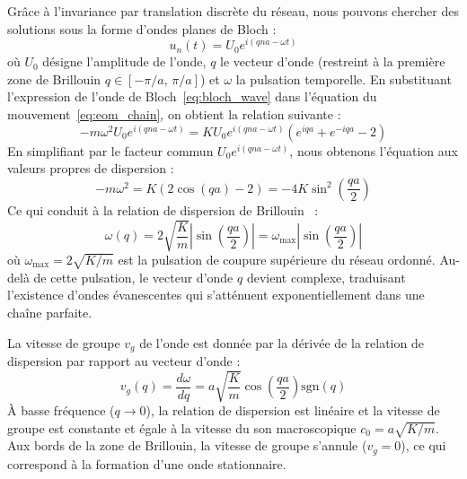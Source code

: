 \documentclass[11pt, a4paper, twoside]{article}
\begin{document}
Grâce à l'invariance par translation discrète du réseau, nous pouvons chercher des solutions sous la forme d'ondes planes de Bloch :
\begin{equation}\label{eq:bloch_wave}
    u_n(t) = U_0 e^{i(q n a - \omega t)}
\end{equation}
où $U_0$ désigne l'amplitude de l'onde, $q$ le vecteur d'onde (restreint à la première zone de Brillouin $q \in [-\pi/a, \, \pi/a]$) et $\omega$ la pulsation temporelle. En substituant l'expression de l'onde de Bloch~\eqref{eq:bloch_wave} dans l'équation du mouvement~\eqref{eq:eom_chain}, on obtient la relation suivante :
\begin{equation*}
    -m \omega^2 U_0 e^{i(q n a - \omega t)} = K U_0 e^{i(q n a - \omega t)} \left( e^{iqa} + e^{-iqa} - 2 \right)
\end{equation*}
En simplifiant par le facteur commun $U_0 e^{i(q n a - \omega t)}$, nous obtenons l'équation aux valeurs propres de dispersion :
\begin{equation*}
    -m \omega^2 = K \left( 2\cos(qa) - 2 \right) = -4K \sin^2\left(\frac{qa}{2}\right)
\end{equation*}
Ce qui conduit à la relation de dispersion de Brillouin~\cite{brillouin1953wave} :
\begin{equation}\label{eq:dispersion_mono}
    \omega(q) = 2\sqrt{\frac{K}{m}} \left| \sin\left(\frac{qa}{2}\right) \right| = \omega_{\max} \left| \sin\left(\frac{qa}{2}\right) \right|
\end{equation}
où $\omega_{\max} = 2\sqrt{K/m}$ est la pulsation de coupure supérieure du réseau ordonné. Au-delà de cette pulsation, le vecteur d'onde $q$ devient complexe, traduisant l'existence d'ondes évanescentes qui s'atténuent exponentiellement dans une chaîne parfaite.

La vitesse de groupe $v_g$ de l'onde est donnée par la dérivée de la relation de dispersion par rapport au vecteur d'onde :
\begin{equation*}
    v_g(q) = \frac{d\omega}{dq} = a\sqrt{\frac{K}{m}} \cos\left(\frac{qa}{2}\right) \mathrm{sgn}(q)
\end{equation*}
À basse fréquence ($q \to 0$), la relation de dispersion est linéaire et la vitesse de groupe est constante et égale à la vitesse du son macroscopique $c_0 = a\sqrt{K/m}$. Aux bords de la zone de Brillouin, la vitesse de groupe s'annule ($v_g = 0$), ce qui correspond à la formation d'une onde stationnaire.
\end{document}
